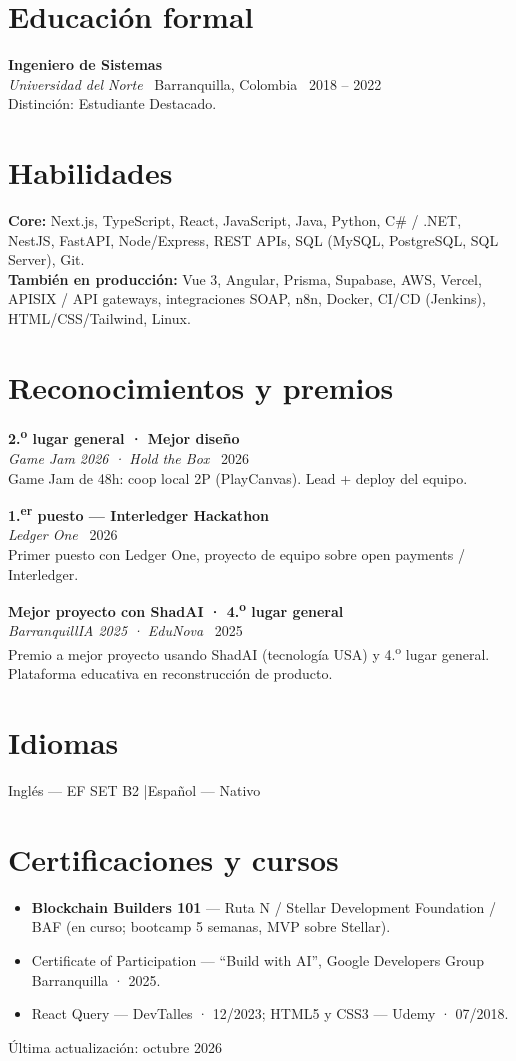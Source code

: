 \documentclass[10.5pt,a4paper]{article}
\newcommand{\Edu}[4]{%
  \noindent\textbf{#1}\\[-0.05em]
  {\small\textit{#2} \textbar\ #4 \textbar\ #3}\\[0.05em]
}
\newcommand{\Award}[4]{%
  \vspace{0.22em}%
  \noindent\textbf{#1}\\[-0.05em]
  {\small\textit{#2} \textbar\ #3}\\[0.05em]
  {\small #4}\par
}
\begin{document}
\vspace{2.5em}
\section{Educación formal}
\Edu{Ingeniero de Sistemas}{Universidad del Norte}{2018 -- 2022}{Barranquilla, Colombia}
Distinción: Estudiante Destacado.

\section{Habilidades}
\textbf{Core:} Next.js, TypeScript, React, JavaScript, Java, Python, C\# / .NET, NestJS,
FastAPI, Node/Express, REST APIs, SQL (MySQL, PostgreSQL, SQL Server), Git.\\
\textbf{También en producción:} Vue 3, Angular, Prisma, Supabase, AWS, Vercel,
APISIX / API gateways, integraciones SOAP, n8n, Docker, CI/CD (Jenkins), HTML/CSS/Tailwind,
Linux.

\section{Reconocimientos y premios}
\Award{2.\textsuperscript{o} lugar general · Mejor diseño}{Game Jam 2026 · Hold the Box}{2026}{%
  Game Jam de 48h: coop local 2P (PlayCanvas). Lead + deploy del equipo.}
\Award{1.\textsuperscript{er} puesto --- Interledger Hackathon}{Ledger One}{2026}{%
  Primer puesto con Ledger One, proyecto de equipo sobre open payments / Interledger.}
\Award{Mejor proyecto con ShadAI · 4.\textsuperscript{o} lugar general}{BarranquillIA 2025 · EduNova}{2025}{%
  Premio a mejor proyecto usando ShadAI (tecnología USA) y 4.\textsuperscript{o} lugar
  general. Plataforma educativa en reconstrucción de producto.}

\section{Idiomas}
Inglés --- EF SET B2 \quad|\quad Español --- Nativo

\section{Certificaciones y cursos}
\begin{itemize}
  \item \textbf{Blockchain Builders 101} --- Ruta N / Stellar Development Foundation / BAF
        (en curso; bootcamp 5 semanas, MVP sobre Stellar).
  \item Certificate of Participation --- ``Build with AI'', Google Developers Group
        Barranquilla · 2025.
  \item React Query --- DevTalles · 12/2023; HTML5 y CSS3 --- Udemy · 07/2018.
\end{itemize}

\vspace{0.6em}
{\footnotesize\color{muted}Última actualización: octubre 2026}
\end{document}
